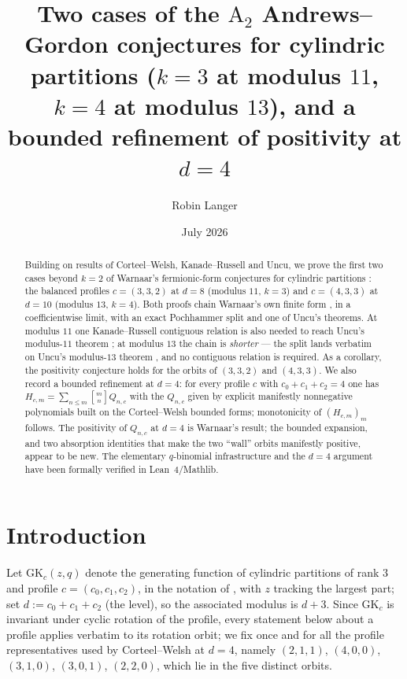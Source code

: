 \documentclass[11pt]{article}
\title{Two cases of the $\mathrm{A}_2$ Andrews--Gordon conjectures for
cylindric partitions ($k=3$ at modulus $11$, $k=4$ at modulus $13$),
and a bounded refinement of positivity at $d=4$}
\author{Robin Langer}
\date{July 2026}
\newcommand{\qbin}[2]{\genfrac{[}{]}{0pt}{}{#1}{#2}}
\newcommand{\GK}{\mathrm{GK}}
\begin{document}
\maketitle

\begin{abstract}
Building on results of Corteel--Welsh, Kanade--Russell and Uncu, we prove
the first two cases beyond $k=2$ of Warnaar's fermionic-form conjectures
for cylindric partitions \cite[Conjectures~2.5 and~2.11]{W23}: the
balanced profiles $c=(3,3,2)$ at $d=8$ (modulus $11$, $k=3$) and
$c=(4,3,3)$ at $d=10$ (modulus $13$, $k=4$). Both proofs chain Warnaar's
own finite form \cite[Proposition~7.1]{W23}, in a coefficientwise limit,
with an exact Pochhammer split and one of Uncu's theorems. At modulus
$11$ one Kanade--Russell contiguous relation \cite[Lemma~9.2]{KR22} is
also needed to reach Uncu's modulus-$11$ theorem
\cite[Theorem~4.3]{Uncu23}; at modulus $13$ the chain is \emph{shorter}
--- the split lands verbatim on Uncu's modulus-$13$ theorem
\cite[Theorem~5.3]{Uncu23}, and no contiguous relation is required. As a
corollary, the positivity conjecture \cite[Conjecture~2.7]{W23} holds for
the orbits of $(3,3,2)$ and $(4,3,3)$. We also record a bounded refinement at $d=4$: for every profile
$c$ with $c_0+c_1+c_2=4$ one has
$H_{c,m}=\sum_{n\le m}\qbin{m}{n}Q_{n,c}$ with the $Q_{n,c}$ given by
explicit manifestly nonnegative polynomials built on the Corteel--Welsh
bounded forms; monotonicity of $(H_{c,m})_m$ follows. The positivity of
$Q_{n,c}$ at $d=4$ is Warnaar's result; the bounded expansion, and two
absorption identities that make the two ``wall'' orbits manifestly
positive, appear to be new. The elementary $q$-binomial infrastructure and
the $d=4$ argument have been formally verified in Lean~4/Mathlib.
\end{abstract}

\section{Introduction}\label{sec:intro}

Let $\GK_c(z,q)$ denote the generating function of cylindric partitions of
rank $3$ and profile $c=(c_0,c_1,c_2)$, in the notation of \cite{W23}, with
$z$ tracking the largest part; set $d:=c_0+c_1+c_2$ (the level), so the
associated modulus is $d+3$. Since $\GK_c$ is invariant under cyclic
rotation of the profile, every statement below about a profile applies
verbatim to its rotation orbit; we fix once and for all the profile
representatives used by Corteel--Welsh \cite{CW19} at $d=4$, namely
$(2,1,1)$, $(4,0,0)$, $(3,1,0)$, $(3,0,1)$, $(2,2,0)$, which lie in the
five distinct orbits.
\end{document}
